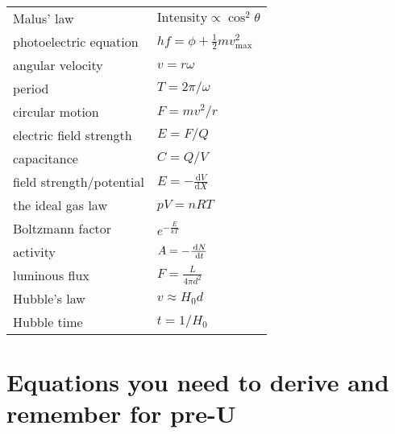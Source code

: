 \documentclass[main.tex]{subfiles}
\begin{document}
\begin{longtable}{ll}
Malus' law & $\text{Intensity} \propto \cos^2{\theta}$\\
photoelectric equation & \(hf = \phi + \frac{1}{2}mv_{\max}^{2}\)\\
angular velocity & $v = r\omega$ \\
period & $T = 2\pi /\omega$\\
circular motion & $F = mv^2/r$\\
electric field strength & $E = F/Q$\\
capacitance & $C = Q/V$\\
field strength/potential & $E = -\frac{\text{d}V}{\text{d}{X}}$ \\
the ideal gas law & $pV = nRT$\\
Boltzmann factor & $e^{- \frac{E}{kT}}$ \\
activity & $A = -\frac{\,\mathrm{d} N}{\,\mathrm{d} t}$\\
luminous flux &\(F = \frac{L}{4\pi d^{2}}\)\\

Hubble's law &\(v \approx H_{0}d\)\\

Hubble time & $t = 1/H_{0}$\\

\end{longtable}

\section{Equations you need to derive and remember for pre-U}
\end{document}
